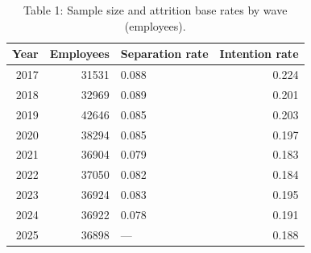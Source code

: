 \begin{table}
\caption{Table 1: Sample size and attrition base rates by wave (employees).}
\label{tab:table1_data}
\begin{tabular}{rrlr}
\toprule
Year & Employees & Separation rate & Intention rate \\
\midrule
2017 & 31531 & 0.088 & 0.224 \\
2018 & 32969 & 0.089 & 0.201 \\
2019 & 42646 & 0.085 & 0.203 \\
2020 & 38294 & 0.085 & 0.197 \\
2021 & 36904 & 0.079 & 0.183 \\
2022 & 37050 & 0.082 & 0.184 \\
2023 & 36924 & 0.083 & 0.195 \\
2024 & 36922 & 0.078 & 0.191 \\
2025 & 36898 & — & 0.188 \\
\bottomrule
\end{tabular}
\end{table}
